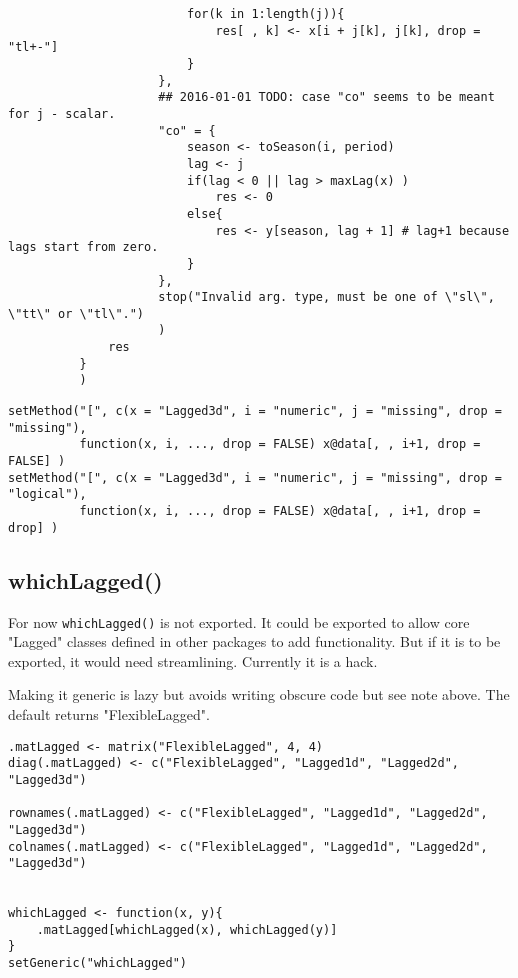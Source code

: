 \documentclass[11pt,a4paper]{article}
\begin{document}
\begin{verbatim}
                         for(k in 1:length(j)){
                             res[ , k] <- x[i + j[k], j[k], drop = "tl+-"]
                         }
                     },
                     ## 2016-01-01 TODO: case "co" seems to be meant for j - scalar.
                     "co" = {
                         season <- toSeason(i, period)
                         lag <- j
                         if(lag < 0 || lag > maxLag(x) )
                             res <- 0
                         else{
                             res <- y[season, lag + 1] # lag+1 because lags start from zero.
                         }
                     },
                     stop("Invalid arg. type, must be one of \"sl\", \"tt\" or \"tl\".")
                     )
              res
          }
          )
\end{verbatim}


\begin{verbatim}
setMethod("[", c(x = "Lagged3d", i = "numeric", j = "missing", drop = "missing"),
          function(x, i, ..., drop = FALSE) x@data[, , i+1, drop = FALSE] )
setMethod("[", c(x = "Lagged3d", i = "numeric", j = "missing", drop = "logical"),
          function(x, i, ..., drop = FALSE) x@data[, , i+1, drop = drop] )
\end{verbatim}

\subsection{whichLagged()}
\label{sec:org79ef637}

For now \texttt{whichLagged()} is not exported. It could be exported to allow core "Lagged" classes
defined in other packages to add functionality. But if it is to be exported, it would need
streamlining. Currently it is a hack.

Making it generic is lazy but avoids writing obscure code but see note above.
The default returns "FlexibleLagged".
\begin{verbatim}
.matLagged <- matrix("FlexibleLagged", 4, 4)
diag(.matLagged) <- c("FlexibleLagged", "Lagged1d", "Lagged2d", "Lagged3d")

rownames(.matLagged) <- c("FlexibleLagged", "Lagged1d", "Lagged2d", "Lagged3d")
colnames(.matLagged) <- c("FlexibleLagged", "Lagged1d", "Lagged2d", "Lagged3d")


whichLagged <- function(x, y){
    .matLagged[whichLagged(x), whichLagged(y)]
}
setGeneric("whichLagged")
\end{verbatim}
\end{document}
